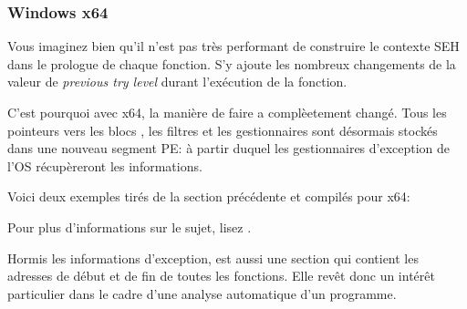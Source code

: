 ﻿\subsubsection{Windows x64}

\label{SEH_win64}

Vous imaginez bien qu'il n'est pas très performant de construire le contexte SEH dans le prologue 
de chaque fonction. S'y ajoute les nombreux changements de la valeur de \emph{previous try level} 
durant l'exécution de la fonction.

C'est pourquoi avec x64, la manière de faire a complèetement changé. Tous les pointeurs vers les 
blocs , les filtres et les gestionnaires sont désormais stockés dans une nouveau segment 
PE:  à partir duquel les gestionnaires d'exception de l'\ac{OS} récupèreront les 
informations.

Voici deux exemples tirés de la section précédente et compilés pour x64:





Pour plus d'informations sur le sujet, lisez \IgorSkochinsky.

Hormis les informations d'exception,  est aussi une section qui contient les adresses 
de début et de fin de toutes les fonctions. Elle revêt donc un intérêt particulier dans le cadre 
d'une analyse automatique d'un programme.

